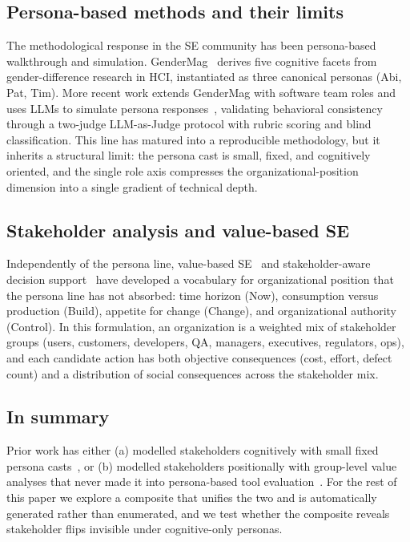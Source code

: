 \documentclass[10pt,conference]{IEEEtran}
\begin{document}
\subsection{Persona-based methods and their limits}
The methodological response in the SE community has been persona-based
walkthrough and simulation. GenderMag~\cite{burnett2016gendermag} derives
five cognitive facets from gender-difference research in HCI, instantiated as
three canonical personas (Abi, Pat, Tim). More recent work extends GenderMag
with software team roles and uses LLMs to simulate persona
responses~\cite{estes2026se4ai}, validating behavioral consistency through a
two-judge LLM-as-Judge protocol with rubric scoring and blind classification.
This line has matured into a reproducible methodology, but it inherits a
structural limit: the persona cast is small, fixed, and cognitively oriented,
and the single role axis compresses the organizational-position dimension
into a single gradient of technical depth.

\subsection{Stakeholder analysis and value-based SE}
Independently of the persona line, value-based
SE~\cite{boehm2004valuebased,biffl2005vbse} and stakeholder-aware decision
support~\cite{menzies2009value} have developed a vocabulary for
organizational position that the persona line has not absorbed: time horizon
(\textsf{Now}), consumption versus production (\textsf{Build}), appetite for
change (\textsf{Change}), and organizational authority (\textsf{Control}). In
this formulation, an organization is a weighted mix of stakeholder groups
(users, customers, developers, QA, managers, executives, regulators, ops),
and each candidate action has both objective consequences (cost, effort,
defect count) and a distribution of social consequences across the
stakeholder mix.

\subsection*{In summary}
Prior work has either (a) modelled stakeholders cognitively with small fixed
persona casts~\cite{burnett2016gendermag,estes2026se4ai}, or (b) modelled
stakeholders positionally with group-level value analyses that never made it
into persona-based tool
evaluation~\cite{boehm2004valuebased,menzies2009value}. For the rest of this
paper we explore a composite that unifies the two and is automatically
generated rather than enumerated, and we test whether the composite reveals
stakeholder flips invisible under cognitive-only personas.
\end{document}
